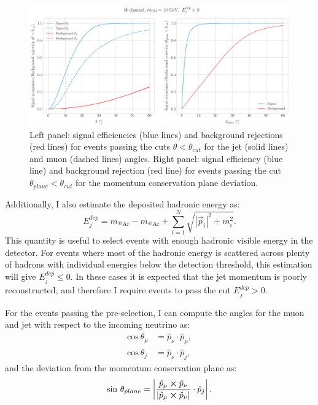 \begin{figure}[t]
	\centering
	\includegraphics[width=0.95\linewidth]{Images/DM_Analysis/solardm_bb_100_dis_angular_cuts.pdf}
	\caption[Signal efficiency and background rejection for the $b\bar{b}$ sample with $m_{\mathrm{DM}} = 10 \ \mathrm{GeV}$ as a function of the angular cuts.]{Left panel: signal efficiencies (blue lines) and background rejections (red lines) for events passing the cuts $\theta < \theta_{cut}$ for the jet (solid lines) and muon (dashed lines) angles. Right panel: signal efficiency (blue line) and background rejection (red line) for events passing the cut $\theta_{plane} < \theta_{cut}$ for the momentum conservation plane deviation.}
	\label{fig:solardm_bb_100_dis_angular_cuts}
\end{figure}

Additionally, I also estimate the deposited hadronic energy as:
\begin{equation}
	E_{j}^{dep} = m_{^{39}\mathrm{Ar}} - m_{^{40}\mathrm{Ar}} + \sum_{i=1}^{N} \sqrt{|\vec{p}_{i}|^{2} + m_{i}^{2}}.
\end{equation}
This quantity is useful to select events with enough hadronic visible energy in the detector. For events where most of the hadronic energy is scattered across plenty of hadrons with individual energies below the detection threshold, this estimation will give $E_{j}^{dep} \leq 0$. In these cases it is expected that the jet momentum is poorly reconstructed, and therefore I require events to pass the cut $E_{j}^{dep} > 0$.

For the events passing the pre-selection, I can compute the angles for the muon and jet with respect to the incoming neutrino as:
\begin{align}
	\mathrm{cos} \ \theta_{\mu} &= \hat{p}_{\nu} \cdot \hat{p}_{\mu},\\
	\mathrm{cos} \ \theta_{j} &= \hat{p}_{\nu} \cdot \hat{p}_{j},
\end{align}
and the deviation from the momentum conservation plane as:
\begin{equation}
	\mathrm{sin} \ \theta_{plane} = \left|\frac{\hat{p}_{\mu} \cross \hat{p}_{\nu}}{|\hat{p}_{\mu} \cross \hat{p}_{\nu}|} \cdot \hat{p}_{j}\right|.
\end{equation}

